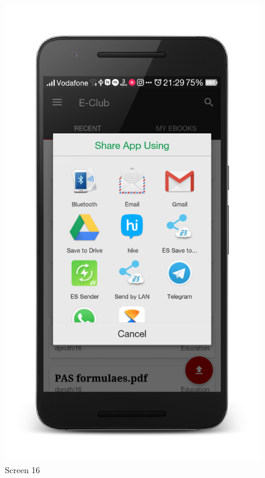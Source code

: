 \newpage
\begin{figure}[ht]
\centering
\includegraphics[scale=0.13]{images/d4.png}
\caption{Screen 16}
\end{figure}

